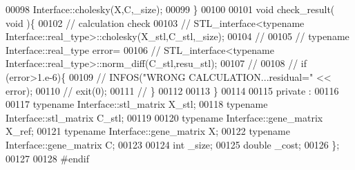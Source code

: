 \begin{DoxyCode}
00098       Interface::cholesky(X,C,\_size);
00099   \}
00100 
00101   \textcolor{keywordtype}{void} check\_result( \textcolor{keywordtype}{void} )\{
00102     \textcolor{comment}{// calculation check}
00103 \textcolor{comment}{//     STL\_interface<typename Interface::real\_type>::cholesky(X\_stl,C\_stl,\_size);}
00104 \textcolor{comment}{//}
00105 \textcolor{comment}{//     typename Interface::real\_type error=}
00106 \textcolor{comment}{//       STL\_interface<typename Interface::real\_type>::norm\_diff(C\_stl,resu\_stl);}
00107 \textcolor{comment}{//}
00108 \textcolor{comment}{//     if (error>1.e-6)\{}
00109 \textcolor{comment}{//       INFOS("WRONG CALCULATION...residual=" << error);}
00110 \textcolor{comment}{//       exit(0);}
00111 \textcolor{comment}{//     \}}
00112 
00113   \}
00114 
00115 private :
00116 
00117   \textcolor{keyword}{typename} Interface::stl\_matrix X\_stl;
00118   \textcolor{keyword}{typename} Interface::stl\_matrix C\_stl;
00119 
00120   \textcolor{keyword}{typename} Interface::gene\_matrix X\_ref;
00121   \textcolor{keyword}{typename} Interface::gene\_matrix X;
00122   \textcolor{keyword}{typename} Interface::gene\_matrix C;
00123 
00124   \textcolor{keywordtype}{int} \_size;
00125   \textcolor{keywordtype}{double} \_cost;
00126 \};
00127 
00128 \textcolor{preprocessor}{#endif}
\end{DoxyCode}

